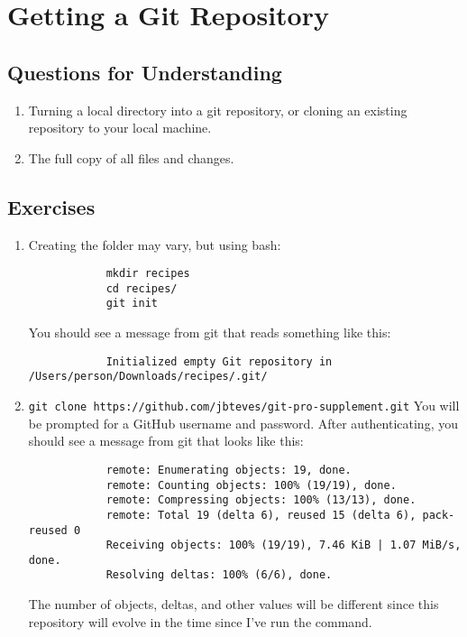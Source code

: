 \section{Getting a Git Repository}

\subsection{Questions for Understanding}
\begin{enumerate}
    \item Turning a local directory into a git repository, or cloning an
        existing repository to your local machine.
    \item The full copy of all files and changes.
\end{enumerate}

\subsection{Exercises}
\begin{enumerate}
    \item Creating the folder may vary, but using bash:
        \begin{verbatim}
            mkdir recipes
            cd recipes/
            git init
        \end{verbatim}
        You should see a message from git that reads something like this:
        \begin{verbatim}
            Initialized empty Git repository in /Users/person/Downloads/recipes/.git/
        \end{verbatim}
    \item \verb+git clone https://github.com/jbteves/git-pro-supplement.git+
        You will be prompted for a GitHub username and password.
        After authenticating, you should see a message from git that looks
        like this:
        \begin{verbatim}
            remote: Enumerating objects: 19, done.
            remote: Counting objects: 100% (19/19), done.
            remote: Compressing objects: 100% (13/13), done.
            remote: Total 19 (delta 6), reused 15 (delta 6), pack-reused 0
            Receiving objects: 100% (19/19), 7.46 KiB | 1.07 MiB/s, done.
            Resolving deltas: 100% (6/6), done.
        \end{verbatim}
        The number of objects, deltas, and other values will be different
        since this repository will evolve in the time since I've run the
        command.
\end{enumerate}
